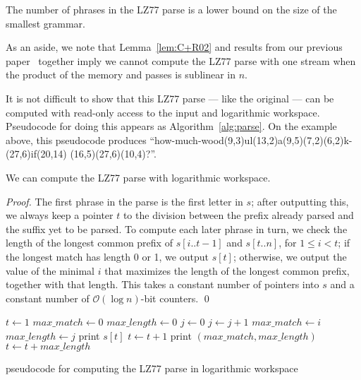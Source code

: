 \documentclass[runningheads]{llncs}
\newcommand{\Oh}[1]
    {\ensuremath{\mathcal{O}\!\left( {#1} \right)}}
\begin{document}
\begin{lemma} \label{lem:C+R02}
The number of phrases in the LZ77 parse is a lower bound on the size of the smallest grammar.
\end{lemma}

\noindent As an aside, we note that Lemma~\ref{lem:C+R02} and results from our previous paper~\cite{Gag09} together imply we cannot compute the LZ77 parse with one stream when the product of the memory and passes is sublinear in $n$.

It is not difficult to show that this LZ77 parse --- like the original --- can be computed with read-only access to the input and logarithmic workspace.  Pseudocode for doing this appears as Algorithm~\ref{alg:parse}.  On the example above, this pseudocode produces ``{\sf how-much-wood(9,3)ul(13,2)a(9,5)(7,2)(6,2)k-(27,6)if(20,14)
\linebreak
(16,5)(27,6)(10,4)?}''.

\begin{lemma} \label{lem:lz77}
We can compute the LZ77 parse with logarithmic workspace.
\end{lemma}

\begin{proof}
The first phrase in the parse is the first letter in $s$; after outputting this, we always keep a pointer $t$ to the division between the prefix already parsed and the suffix yet to be parsed.  To compute each later phrase in turn, we check the length of the longest common prefix of \(s [i..t - 1]\) and \(s [t..n]\), for \(1 \leq i < t\); if the longest match has length 0 or 1, we output \(s [t]\); otherwise, we output the value of the minimal $i$ that maximizes the length of the longest common prefix, together with that length.  This takes a constant number of pointers into $s$ and a constant number of $\Oh{\log n}$-bit counters. \qed
\end{proof}

\begin{algorithm}[t]
\(t \leftarrow 1\)\;
    {\(\mathit{max\_match} \leftarrow 0\)\;
    \(\mathit{max\_length} \leftarrow 0\)\;
        {\(j \leftarrow 0\)\;
            {\(j \leftarrow j + 1\)\;}
            {\(\mathit{max\_match} \leftarrow i\)\;
            \(\mathit{max\_length} \leftarrow j\)\;}}
        {print \(s[t]\)\;
        \(t \leftarrow t + 1\)\;}
        {print \((\mathit{max\_match}, \mathit{max\_length})\)\;
        \(t \leftarrow t + max\_length\)\;}}
\BlankLine
\BlankLine

\caption{pseudocode for computing the LZ77 parse in logarithmic workspace}
\label{alg:parse}
\end{algorithm}
\end{document}
